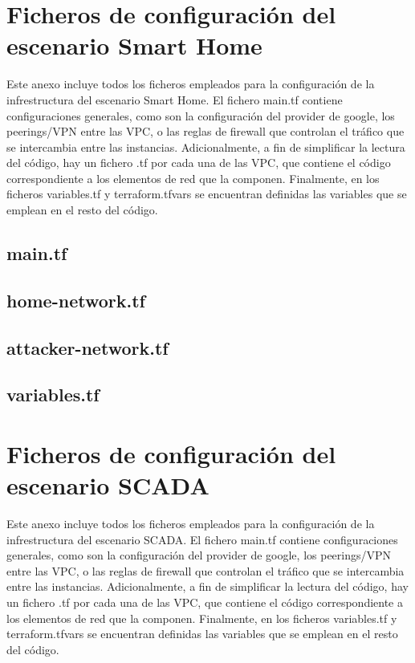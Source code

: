 \chapter{Ficheros de configuración del escenario Smart Home} \label{sec:anxC}
  Este anexo incluye todos los ficheros empleados para la configuración de la infrestructura del escenario Smart Home. El fichero main.tf contiene configuraciones generales, como son la configuración del provider de google, los peerings/VPN entre las VPC, o las reglas de firewall que controlan el tráfico que se intercambia entre las instancias. Adicionalmente, a fin de simplificar la lectura del código, hay un fichero .tf por cada una de las VPC, que contiene el código correspondiente a los elementos de red que la componen. Finalmente, en los ficheros variables.tf y terraform.tfvars se encuentran definidas las variables que se emplean en el resto del código.

\section*{main.tf} 


\section*{home-network.tf}


\section*{attacker-network.tf}


\section*{variables.tf}


\chapter{Ficheros de configuración del escenario SCADA} \label{sec:anxD}
  Este anexo incluye todos los ficheros empleados para la configuración de la infrestructura del escenario SCADA. El fichero main.tf contiene configuraciones generales, como son la configuración del provider de google, los peerings/VPN entre las VPC, o las reglas de firewall que controlan el tráfico que se intercambia entre las instancias. Adicionalmente, a fin de simplificar la lectura del código, hay un fichero .tf por cada una de las VPC, que contiene el código correspondiente a los elementos de red que la componen. Finalmente, en los ficheros variables.tf y terraform.tfvars se encuentran definidas las variables que se emplean en el resto del código.

